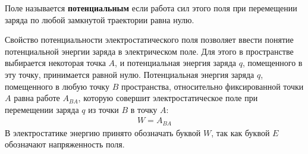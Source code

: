 \documentclass[__main__.tex]{subfiles}
\begin{document}
\begin{definition}
    Поле называется \textbf{потенциальным} если работа сил этого поля при перемещении заряда по любой замкнутой траектории равна нулю.
\end{definition}
Свойство потенциальности электростатического поля позволяет ввести понятие потенциальной энергии заряда в электрическом поле. Для этого в пространстве выбирается некоторая точка $A$, и потенциальная энергия заряда $q$, помещенного в эту точку, принимается равной нулю. Потенциальная энергия заряда $q$, помещенного в любую точку $B$ пространства, относительно фиксированной точки $A$ равна работе $A_{BA}$, которую совершит электростатическое поле при перемещении заряда $q$ из точки $B$ в точку $A$:
\begin{gather*}
    W = A_{BA}
\end{gather*}
В электростатике энергию принято обозначать буквой $W$, так как буквой $E$ обозначают напряженность поля.
\end{document}
